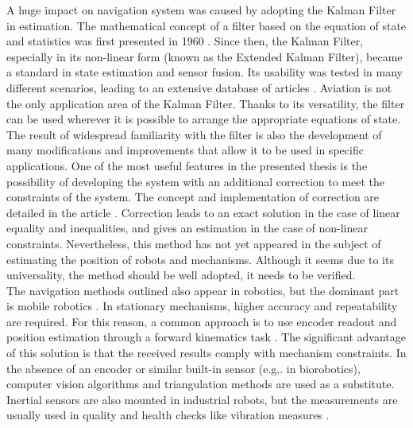 A huge impact on navigation system was caused by adopting the Kalman Filter in estimation. The mathematical concept of a filter based on the equation of state and statistics was first presented in 1960 \cite{kalman}. Since then, the Kalman Filter, especially in its non-linear form (known as the Extended Kalman Filter), became a standard in state estimation and sensor fusion. Its usability was tested in many different scenarios, leading to an extensive database of articles \cite{ekf_poor} \cite{s16020264} \cite{s120709566}. Aviation is not the only application area of the Kalman Filter. Thanks to its versatility, the filter can be used wherever it is possible to arrange the appropriate equations of state.\\

The result of widespread familiarity with the filter is also the development of many modifications and improvements that allow it to be used in specific applications. One of the most useful features in the presented thesis is the possibility of developing the system with an additional correction to meet the constraints of the system. The concept and implementation of correction are detailed in the article \cite{simon}. Correction leads to an exact solution in the case of linear equality and inequalities, and gives an estimation in the case of non-linear constraints. Nevertheless, this method has not yet appeared in the subject of estimating the position of robots and mechanisms. Although it seems due to its universality, the method should be well adopted, it needs to be verified.\\

The navigation methods outlined also appear in robotics, but the dominant part is mobile robotics \cite{accelerometer_mobile}. In stationary mechanisms, higher accuracy and repeatability are required. For this reason, a common approach is to use encoder readout and position estimation through a forward kinematics task \cite{forward_kinematics}. The significant advantage of this solution is that the received results comply with mechanism constraints. In the absence of an encoder or similar built-in sensor (e.g,. in biorobotics), computer vision algorithms \cite{cv_positioning} \cite{cv_positioning2} and triangulation methods \cite{igps} are used as a substitute. Inertial sensors are also mounted in industrial robots, but the measurements are usually used in quality and health checks like vibration measures \cite{Dogrusoz_2020}.\\

